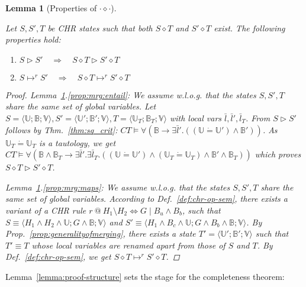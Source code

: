 \documentclass[acmtocl]{acmtrans2m}
\newtheorem{lemma}[theorem]{Lemma}
\newcommand{\de}{\dot=}
\newcommand\state[1]{\langle #1 \rangle}
\newcommand\ent{\rhd}
\newcommand{\B}{\ensuremath{\mathbb{B}}}
\newcommand{\U}{\ensuremath{\mathbb{U}}}
\newcommand{\V}{\ensuremath{\mathbb{V}}}
\newcommand{\bl}{\bar{l}}
\begin{document}
\begin{lemma}[Properties of $\cdot\diamond\cdot$]
	\label{lemma:merging_derived}

Let $S,S',T$ be CHR states such that both $S\diamond T$ and $S'\diamond T$
exist. The following properties hold:

\begin{enumerate}
  \item \label{prop:mrg:entail}
  $
  	S\ent S' \quad\Rightarrow\quad S\diamond T\ent S'\diamond T
  $
  \item \label{prop:mrg:maps}
  $
  	S\mapsto^r S' \quad\Rightarrow\quad S\diamond T\mapsto^r S'\diamond T
  $
\end{enumerate}

\begin{proof}
Lemma~\ref{lemma:merging_derived}.\ref{prop:mrg:entail}: We assume w.l.o.g. that
the states $S,S',T$ share the same set of global variables. Let
$S=\state{\U;\B;\V},S'=\state{\U';\B';\V},T=\state{\U_T;\B_T;\V}$ with local vars
$\bl,\bl',\bl_T$.
From $S\ent S'$ follows by Thm.~\ref{thm:sq_crit}:
$
	CT\models \forall (\B \rightarrow \exists \bl'.((\U \de \U') \wedge \B'))
$.
As $\U_T \de \U_T$ is a tautology, we get $
	CT\models \forall (\B\wedge\B_T \rightarrow \exists \bl'.\exists\bl_T.((\U
\de \U')
	\wedge (\U_T \de \U_T) \wedge \B' \wedge \B_T))
$
which proves $S\diamond T \ent S'\diamond T$.

Lemma~\ref{lemma:merging_derived}.\ref{prop:mrg:maps}: We assume w.l.o.g. that
the states $S,S',T$ share the same set of global variables. According to
Def.~\ref{def:chr-op-sem}, there exists a variant of a CHR rule $r\ @\ H_1
\setminus H_2 \Leftrightarrow G\mid B_u \wedge B_b$, such that $S\equiv\state{H_1
\wedge H_2 \wedge \U;G\wedge\B;\V}$ and $S'\equiv \state{H_1 \wedge B_c \wedge
\U;G\wedge B_b\wedge\B;\V}$. By Prop.~\ref{prop:generalityofmerging}, there
exists a state $T'=\state{\U';\B';\V}$ such that $T'\equiv T$ whose local
variables are renamed apart from those of $S$ and $T$. By
Def.~\ref{def:chr-op-sem}, we get $S\diamond T\mapsto^r S'\diamond T$.
\end{proof}
\end{lemma}

Lemma~\ref{lemma:proof-structure} sets the stage for the completeness theorem:
\end{document}
